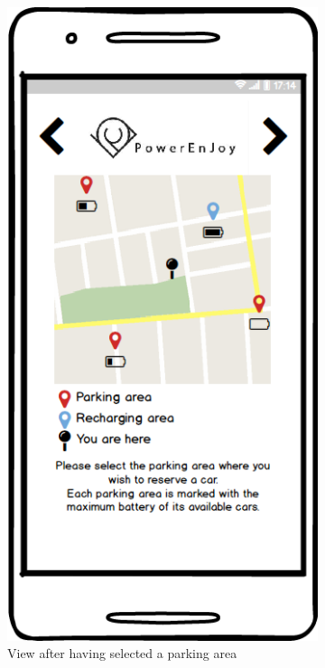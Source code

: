 \begin{figure}[h]
\begin{subfigure}{0.3\textwidth}
			\includegraphics[scale=0.25]{img/mockups/User_parking_areas.png}
			\caption{View after having selected a parking area}
			\label{fig:subim2}
		\end{subfigure}
		\begin{subfigure}{0.3\textwidth}

\end{subfigure}
\end{figure}
